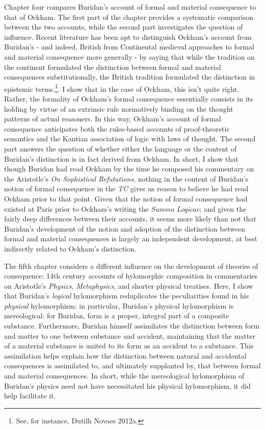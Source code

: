 \documentclass[]{article}
\begin{document}
Chapter four compares Buridan's account of formal and material consequence to that of Ockham. The first part of the chapter provides a systematic comparison between the two accounts, while the second part investigates the question of influence. Recent literature has been apt to distinguish Ockham's account from Buridan's - and indeed, British from Continental medieval approaches to formal and material consequence more generally - by saying that while the tradition on the continent formulated the distinction between formal and material consequences substitutionally, the British tradition formulated the distinction in epistemic terms.\footnote{See, for instance, Dutilh Novaes 2012a.}. I show that in the case of Ockham, this isn't quite right. Rather, the formality of Ockham's formal consequence essentially consists in its holding by virtue of an extrinsic rule normatively binding on the thought patterns of actual reasoners. In this way, Ockham's account of formal consequence anticipates both the rules-based accounts of proof-theoretic semantics and the Kantian association of logic with laws of thought. The second part answers the question of whether either the language or the content of Buridan's distinction is in fact derived from Ockham. In short, I show that though Buridan had read Ockham by the time he composed his commentary on the Aristotle's \textit{On Sophistical Refutations}, nothing in the content of Buridan's notion of formal consequence in the \textit{TC} gives us reason to believe he had read Ockham prior to that point. Given that the notion of formal consequence had existed at Paris prior to Ockham's writing the \textit{Summa Logicae}; and given the fairly deep differences between their accounts, it seems more likely than not that Buridan's development of the notion and adoption of the distinction between formal and material consequences is largely an independent development, at best indirectly related to Ockham's distinction.

The fifth chapter considers a different influence on the development of theories of consequence: 14th century accounts of hylomorphic composition in commentaries on Aristotle's \textit{Physics}, \textit{Metaphysics}, and shorter physical treatises. Here, I show that Buridan's \textit{logical} hylomorphism reduplicates the peculiarities found in his \textit{physical} hylomorphism: in particular, Buridan's physical hylomorphism is mereological: for Buridan, form is a proper, integral part of a composite substance. Furthermore, Buridan himself assimilates the distinction between form and matter to one between substance and accident, maintaining that the matter of a material substance is united to its form as an accident to a substance. This assimilation helps explain how the distinction between natural and accidental consequences is assimilated to, and ultimately supplanted by, that between formal and material consequences. In short, while the mereological hylomorphism of Buridan's physics need not have necessitated his physical hylomorphism, it did help facilitate it.
\end{document}
